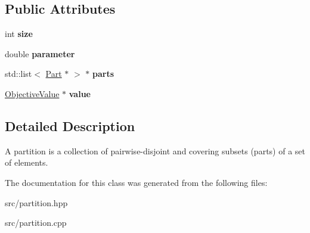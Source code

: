 \subsection*{Public Attributes}
\begin{DoxyCompactItemize}
\item 
\hypertarget{classPartition_a718bdba639f222d90d23480b58caa1f9}{int {\bfseries size}}\label{classPartition_a718bdba639f222d90d23480b58caa1f9}

\item 
\hypertarget{classPartition_a1125b9b5548fa65e98a6dd94279c53bc}{double {\bfseries parameter}}\label{classPartition_a1125b9b5548fa65e98a6dd94279c53bc}

\item 
\hypertarget{classPartition_a887cae6498c54754779d7956b48e8d3e}{std\-::list$<$ \hyperlink{classPart}{Part} $\ast$ $>$ $\ast$ {\bfseries parts}}\label{classPartition_a887cae6498c54754779d7956b48e8d3e}

\item 
\hypertarget{classPartition_acb93c172b3e9a1bb4c6e0b1c5a50a13d}{\hyperlink{classObjectiveValue}{Objective\-Value} $\ast$ {\bfseries value}}\label{classPartition_acb93c172b3e9a1bb4c6e0b1c5a50a13d}

\end{DoxyCompactItemize}


\subsection{Detailed Description}
A partition is a collection of pairwise-\/disjoint and covering subsets (parts) of a set of elements. 

The documentation for this class was generated from the following files\-:\begin{DoxyCompactItemize}
\item 
src/partition.\-hpp\item 
src/partition.\-cpp\end{DoxyCompactItemize}

